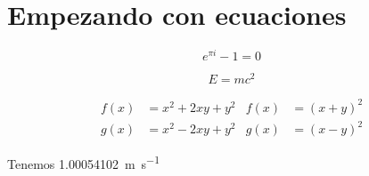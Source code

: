 \documentclass[12pt]{report}
\begin{document}
	\chapter{Empezando con ecuaciones}
		
		\lipsum[1]
		
		\begin{equation}\label{equ:most-beautiful-eq}
			e^{\pi i} -1 = 0
		\end{equation}
		
		\begin{equation}\label{equ:most-beautiful-eq}
			E = m c^{2}
		\end{equation}
		
		\lipsum[1][1-3]
		
		\begin{align}
			f(x) &= x^{2} + 2xy + y^{2} &
				f(x) &= (x+y)^{2} \\
			g(x) &= x^{2} - 2xy + y^{2} &
				g(x) &= (x-y)^{2}
		\end{align}
		
		Tenemos \qty{1.00054102}{\metre\per\second}
				
\end{document}
